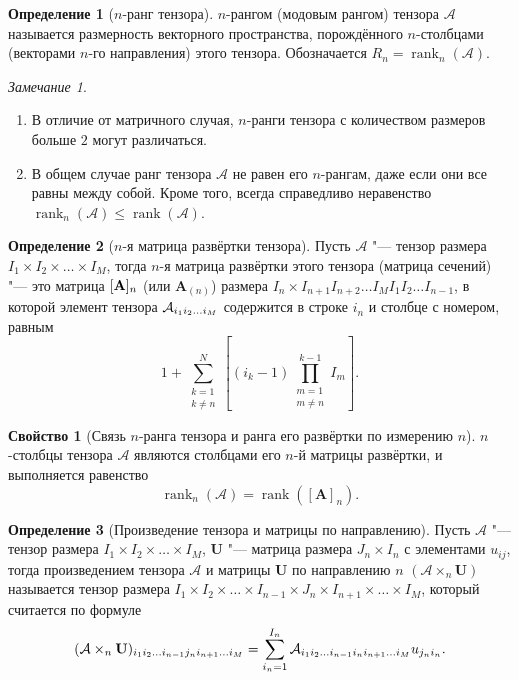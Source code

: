 \documentclass[specialist,
  substylefile=spbu.rtx,
subf,href,colorlinks=true, 12pt]{disser}
\theoremstyle{plain}
\theoremstyle{definition}
\newtheorem{definition}{Определение}[section]
\newtheorem{property}{Свойство}[section]
\theoremstyle{remark}
\newtheorem*{remark}{Замечание}
\begin{document}
\begin{definition}[$n$-ранг тензора]
  $n$-рангом (модовым рангом) тензора $\mathcal{A}$ называется размерность векторного пространства, порождённого
  $n$-столбцами (векторами $n$-го направления) этого тензора.
  Обозначается $R_n=\operatorname{rank}_{n}(\mathcal{A})$.
\end{definition}

\begin{remark}
  \begin{enumerate}
    \item В отличие от матричного случая, $n$-ранги тензора с количеством размеров больше $2$ могут различаться.
    \item В общем случае ранг тензора $\mathcal{A}$ не равен его $n$-рангам, даже если они все равны между
      собой.
      Кроме того, всегда справедливо неравенство
      $\operatorname{rank}_n(\mathcal{A})\leqslant \operatorname{rank}(\mathcal{A})$.
  \end{enumerate}
\end{remark}

\begin{definition}[$n$-я матрица развёртки тензора]
  Пусть $\mathcal{A}$ "--- тензор размера \linebreak $I_1\times I_2\times\ldots\times I_M$, тогда $n$-я матрица
  развёртки этого тензора (матрица сечений) "--- это матрица $[\mathbf{A}]_n$ (или $\mathbf{A}_{(n)}$)
  размера $I_n\times I_{n+1}I_{n+2}\ldots I_{M}I_{1}I_{2}\ldots I_{n-1}$,
  в которой элемент тензора $\mathcal{A}_{i_1 i_2\ldots i_M}$ содержится в строке $i_n$ и столбце с номером, равным
  \[
    1 + \sum_{\substack{k = 1 \\ k \ne n}}^{N} \left[(i_k - 1)
    \prod_{\substack{m=1 \\ m\ne n}}^{k-1} I_m\right].
  \]
\end{definition}

\begin{property}
  [Связь $n$-ранга тензора и ранга его развёртки по измерению $n$]
  $n$-столб\-цы тензора $\mathcal{A}$ являются столбцами его $n$-й матрицы развёртки, и выполняется равенство
  \[
    \operatorname{rank}_{n}(\mathcal{A})=\operatorname{rank}\left(\left[\mathbf{A}\right]_n\right).
  \]
\end{property}

\begin{definition}[Произведение тензора и матрицы по направлению]
  Пусть $\mathcal A$ "--- тензор размера $I_1\times I_2\times\ldots\times I_M$, $\mathbf U$
  "--- матрица размера $J_n\times I_n$ с элементами $u_{ij}$,
  тогда произведением тензора $\mathcal{A}$ и матрицы $\mathbf{U}$ по
  направлению $n$ $(\mathcal{A}\times_n \mathbf U)$ называется тензор размера
  $I_1\times I_2\times\ldots\times I_{n-1} \times J_n\times I_{n+1}\times \ldots\times I_M$,
  который считается по формуле
  \[
    (\mathcal{A}\times_n \mathbf U)_{i_1 i_2\ldots i_{n-1}j_n i_{n+1}\ldots i_M} =
    \sum_{i_n=1}^{I_n} \mathcal{A}_{i_1 i_2\ldots i_{n-1}i_n i_{n+1} \ldots i_M} u_{j_n i_n}.
  \]
\end{definition}
\end{document}
